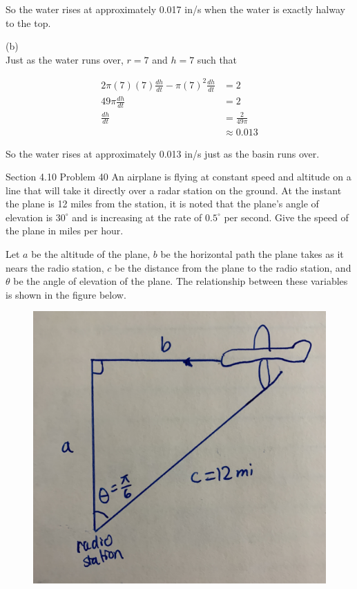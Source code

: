 \documentclass{article}
\begin{document}
    So the water rises at approximately 0.017 in/s when the water is exactly halway to the top.

    (b) \\
    Just as the water runs over, $r=7$ and $h=7$ such that

    \begin{align*}
        2\pi (7)(7) \frac{dh}{dt} - \pi (7)^2 \frac{dh}{dt} &= 2 \\
        49\pi \frac{dh}{dt} &= 2 \\
        \frac{dh}{dt}   &= \frac{2}{49\pi} \\
            &\approx 0.013
    \end{align*}

    So the water rises at approximately 0.013 in/s just as the basin runs over.


    \begin{tbhtheorem}{Section 4.10 Problem 40}
        An airplane is flying at constant speed and altitude on a line that will take it directly over a radar station on the ground. At the instant the plane is 12 miles from the station, it is noted that the plane's
        angle of elevation is $\text{30}^{\circ}$ and is increasing at the rate of $0.5^{\circ}$ per second. Give the speed of the plane in miles per hour.
    \end{tbhtheorem}

    Let $a$ be the altitude of the plane, $b$ be the horizontal path the plane takes as it nears the radio station, $c$ be the distance from the plane to the radio station, and $\theta$ be the angle of elevation of the
    plane. The relationship between these variables is shown in the figure below.
    
    \begin{figure}[hbt!]
        \centering
        \includegraphics[scale=0.05]{plane}
    \end{figure}
\end{document}
